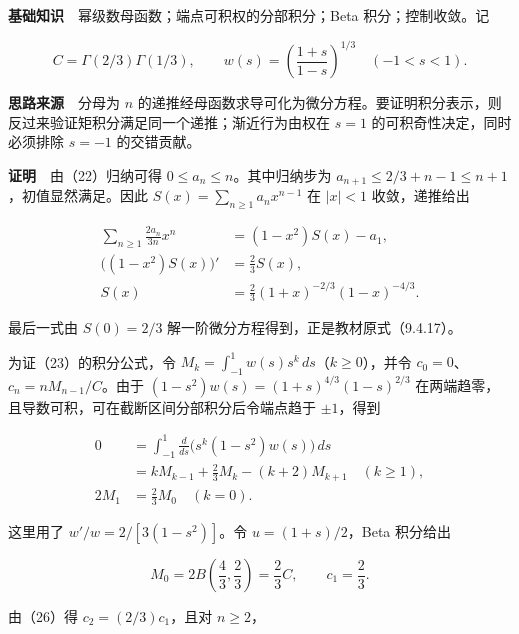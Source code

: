\documentclass[11pt,a4paper]{article}
\begin{document}
\textbf{基础知识}　幂级数母函数；端点可积权的分部积分；Beta
积分；控制收敛。记

\begin{equation}
C=\Gamma(2/3)\Gamma(1/3),\qquad
w(s)=\left(\frac{1+s}{1-s}\right)^{1/3}\quad(-1<s<1).
\tag{24}
\end{equation}

\textbf{思路来源}　分母为 \(n\)
的递推经母函数求导可化为微分方程。要证明积分表示，则反过来验证矩积分满足同一个递推；渐近行为由权在
\(s=1\) 的可积奇性决定，同时必须排除 \(s=-1\) 的交错贡献。

\textbf{证明}　由（22）归纳可得 \(0\le a_n\le n\)。其中归纳步为
\(a_{n+1}\le2/3+n-1\le n+1\)，初值显然满足。因此
\(S(x)=\sum_{n\ge1}a_nx^{n-1}\) 在 \(|x|<1\) 收敛，递推给出

\begin{equation}
\begin{aligned}
\sum_{n\ge1}\frac{2a_n}{3n}x^n
&=(1-x^2)S(x)-a_1,\\
\big((1-x^2)S(x)\big)'&=\frac23S(x),\\
S(x)&=\frac23(1+x)^{-2/3}(1-x)^{-4/3}.
\end{aligned}
\tag{25}
\end{equation}

最后一式由 \(S(0)=2/3\) 解一阶微分方程得到，正是教材原式（9.4.17）。

为证（23）的积分公式，令
\(M_k=\int_{-1}^1w(s)s^k\,ds\)（\(k\ge0\)），并令
\(c_0=0\)、\(c_n=nM_{n-1}/C\)。由于
\((1-s^2)w(s)=(1+s)^{4/3}(1-s)^{2/3}\)
在两端趋零，且导数可积，可在截断区间分部积分后令端点趋于 \(\pm1\)，得到

\begin{equation}
\begin{aligned}
0&=\int_{-1}^1
\frac{d}{ds}\big(s^k(1-s^2)w(s)\big)\,ds\\
&=kM_{k-1}+\frac23M_k-(k+2)M_{k+1}\quad(k\ge1),\\
2M_1&=\frac23M_0\quad(k=0).
\end{aligned}
\tag{26}
\end{equation}

这里用了 \(w'/w=2/[3(1-s^2)]\)。令 \(u=(1+s)/2\)，Beta 积分给出

\begin{equation}
M_0=2B\left(\frac43,\frac23\right)
=\frac23C,\qquad c_1=\frac23.
\tag{27}
\end{equation}

由（26）得 \(c_2=(2/3)c_1\)，且对 \(n\ge2\)，
\end{document}
